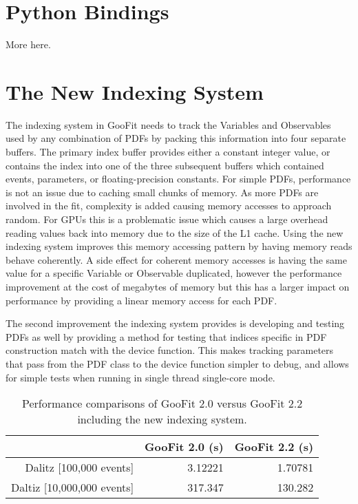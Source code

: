 \documentclass{webofc}
\begin{document}
\section{Python Bindings}
\label{sec-py}
More here.

\section{The New Indexing System}
\label{sec-ind}
The indexing system in GooFit needs to track the Variables and Observables used by any combination of PDFs by packing this information into four separate buffers. The primary index buffer provides either a constant integer value, or contains the index into one of the three subsequent buffers which contained events, parameters, or floating-precision constants\cite{GooFit}. For simple PDFs, performance is not an issue due to caching small chunks of memory. As more PDFs are involved in the fit, complexity is added causing memory accesses to approach random. For GPUs this is a problematic issue which causes a large overhead reading values back into memory due to the size of the L1 cache. Using the new indexing system improves this memory accessing pattern by having memory reads behave coherently. A side effect for coherent memory accesses is having the same value for a specific Variable or Observable duplicated, however the performance improvement at the cost of megabytes of memory but this has a larger impact on performance by providing a linear memory access for each PDF. 

The second improvement the indexing system provides is developing and testing PDFs as well by providing a method for testing that indices specific in PDF construction match with the device function. This makes tracking parameters that pass from the PDF class to the device function simpler to debug, and allows for simple tests when running in single thread single-core mode.

\begin{table}
	\centering
	\begin{tabular}{ |r|r|r| }
		\hline
			 & GooFit 2.0 (s) & GooFit 2.2 (s) \\
		\hline
			Dalitz [100,000 events] & 3.12221 & 1.70781 \\
		\hline
			Daltiz [10,000,000 events] & 317.347 & 130.282 \\
		\hline
	\end{tabular}
	\caption{Performance comparisons of GooFit 2.0 versus GooFit 2.2 including the new indexing system.}
	\label{table:1}
\end{table}
\end{document}
